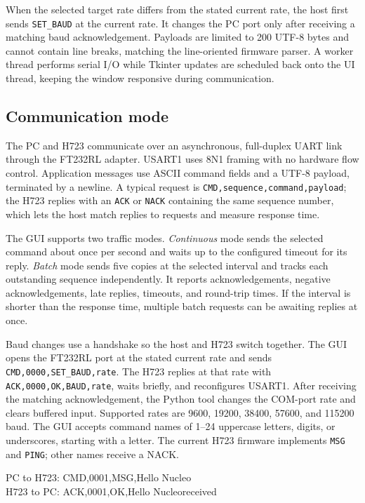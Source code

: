 \documentclass[10pt,a4paper]{article}
\begin{document}
When the selected target rate differs from the stated current rate, the host first sends \texttt{SET\_BAUD} at the current rate. It changes the PC port only after receiving a matching baud acknowledgement. Payloads are limited to 200 UTF-8 bytes and cannot contain line breaks, matching the line-oriented firmware parser. A worker thread performs serial I/O while Tkinter updates are scheduled back onto the UI thread, keeping the window responsive during communication.

\subsection{Communication mode}
The PC and H723 communicate over an asynchronous, full-duplex UART link through the FT232RL adapter. USART1 uses 8N1 framing with no hardware flow control. Application messages use ASCII command fields and a UTF-8 payload, terminated by a newline. A typical request is \texttt{CMD,sequence,command,payload}; the H723 replies with an \texttt{ACK} or \texttt{NACK} containing the same sequence number, which lets the host match replies to requests and measure response time.

The GUI supports two traffic modes. \textit{Continuous} mode sends the selected command about once per second and waits up to the configured timeout for its reply. \textit{Batch} mode sends five copies at the selected interval and tracks each outstanding sequence independently. It reports acknowledgements, negative acknowledgements, late replies, timeouts, and round-trip times. If the interval is shorter than the response time, multiple batch requests can be awaiting replies at once.

Baud changes use a handshake so the host and H723 switch together. The GUI opens the FT232RL port at the stated current rate and sends \texttt{CMD,0000,SET\_BAUD,rate}. The H723 replies at that rate with \texttt{ACK,0000,OK,BAUD,rate}, waits briefly, and reconfigures USART1. After receiving the matching acknowledgement, the Python tool changes the COM-port rate and clears buffered input. Supported rates are 9600, 19200, 38400, 57600, and 115200 baud. The GUI accepts command names of 1--24 uppercase letters, digits, or underscores, starting with a letter. The current H723 firmware implements \texttt{MSG} and \texttt{PING}; other names receive a NACK.

\begin{center}
\small\ttfamily
PC to H723: CMD,0001,MSG,Hello Nucleo\\
H723 to PC: ACK,0001,OK,Hello Nucleoreceived
\end{center}
\end{document}
